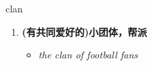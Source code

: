 
\begin{frame}
{\huge clan}
\begin{center}
\begin{enumerate}\Large
  \item \textbf{(有共同爱好的)小团体，帮派}
  \begin{itemize}
    \item \em{\Large{the clan of football fans}}
  \end{itemize}
\end{enumerate}
\end{center}
\end{frame}
